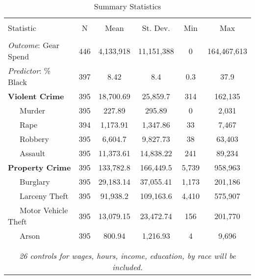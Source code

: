 \documentclass{article}
\begin{document}


\begin{table}[!htbp] \centering 
  \caption{Summary Statistics} 
  \label{} 
\begin{tabular}{@{\extracolsep{5pt}}lccccc} 
\\[-1.8ex]\hline 
\hline \\[-1.8ex] 
Statistic & \multicolumn{1}{c}{N} & \multicolumn{1}{c}{Mean} & \multicolumn{1}{c}{St. Dev.} & \multicolumn{1}{c}{Min} & \multicolumn{1}{c}{Max} \\ 
\hline \\[-1.8ex] 
\emph{Outcome}: Gear Spend & 446 & 4,133,918 & 11,151,388 & 0 & 164,467,613 \\
\emph{Predictor}: \% Black  & 397 & 8.42 & 8.4 & 0.3 & 37.9 \\
\textbf{Violent Crime} & 395 & 18,700.69 & 25,859.7 & 314 & 162,135 \\
\ \ \ Murder & 395 & 227.89 & 295.89 & 0 & 2,031 \\ 
\ \ \ Rape & 394 & 1,173.91 & 1,347.86 & 33 & 7,467 \\
\ \ \ Robbery & 395 & 6,604.7 & 9,827.73 & 38 & 63,403 \\ 
\ \ \ Assault & 395 & 11,373.61 & 14,838.22 & 241 & 89,234 \\  
\textbf{Property Crime} & 395 & 133,782.8 & 166,449.5 & 5,739 & 958,963 \\
\ \ \ Burglary & 395 & 29,183.14 & 37,055.41 & 1,173 & 201,186 \\ 
\ \ \ Larceny Theft & 395 & 91,938.2 & 109,163.6 & 4,410 & 575,907 \\ 
\ \ \ Motor Vehicle Theft & 395 & 13,079.15 & 23,472.74 & 156 & 201,770 \\ 
\ \ \ Arson & 395 & 800.94 & 1,216.93 & 4 & 9,696 \\ 
\\
\hline \\[-1.8ex] 
\multicolumn{6}{c}{\emph{26 controls for wages, hours, income, education, by race will be included. }} \\
\end{tabular} 
\end{table} 
\end{document}
